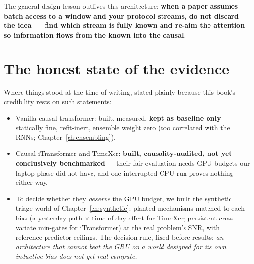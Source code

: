 \begin{center}
\end{center}

The general design lesson outlives this architecture: \textbf{when a paper
assumes batch access to a window and your protocol streams, do not discard
the idea --- find which stream is fully known and re-aim the attention so
information flows from the known into the causal.}

\section{The honest state of the evidence}

Where things stood at the time of writing, stated plainly because this
book's credibility rests on such statements:

\begin{itemize}
\item Vanilla causal transformer: built, measured, \textbf{kept as
  baseline only} --- statically fine, refit-inert, ensemble weight zero
  (too correlated with the RNNs; Chapter~\ref{ch:ensembling}).
\item Causal iTransformer and TimeXer: \textbf{built, causality-audited,
  not yet conclusively benchmarked} --- their fair evaluation needs GPU
  budgets our laptop phase did not have, and one interrupted CPU run
  proves nothing either way.
\item To decide whether they \emph{deserve} the GPU budget, we built the
  synthetic triage world of Chapter~\ref{ch:synthetic}: planted mechanisms
  matched to each bias (a yesterday-path $\times$ time-of-day effect for
  TimeXer; persistent cross-variate min-gates for iTransformer) at the
  real problem's SNR, with reference-predictor ceilings. The decision
  rule, fixed before results: \emph{an architecture that cannot beat the
  GRU on a world designed for its own inductive bias does not get real
  compute.}
\end{itemize}

